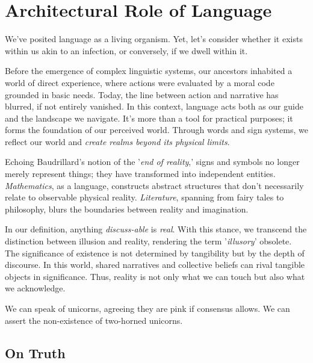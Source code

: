 \documentclass[11pt,a4]{article}
\begin{document}
\section{Architectural Role of Language}

We've posited language as a living organism. Yet, let's consider whether it exists within us akin to an infection, or conversely, if we dwell within it.
\par
Before the emergence of complex linguistic systems, our ancestors inhabited a world of direct experience, where actions were evaluated by a moral code grounded in basic needs. Today, the line between action and narrative has blurred, if not entirely vanished. In this context, language acts both as our guide and the landscape we navigate. It's more than a tool for practical purposes; it forms the foundation of our perceived world. Through words and sign systems, we reflect our world and \textit{create realms beyond its physical limits}.

\par
Echoing Baudrillard's notion of the '\textit{end of reality},' signs and symbols no longer merely represent things; they have transformed into independent entities.
\textit{Mathematics}, as a language, constructs abstract structures that don't necessarily relate to observable physical reality. \textit{Literature}, spanning from fairy tales to philosophy, blurs the boundaries between reality and imagination.

\par
In our definition, anything\textit{ discuss-able} is \textit{real}. With this stance, we transcend the distinction between illusion and reality, rendering the term '\textit{illusory}' obsolete. The significance of existence is not determined by tangibility but by the depth of discourse. In this world, shared narratives and collective beliefs can rival tangible objects in significance. Thus, reality is not only what we can touch but also what we acknowledge.
\par
We can speak of unicorns, agreeing they are pink if consensus allows. We can assert the non-existence of two-horned unicorns.

\subsection{On Truth}
\end{document}
